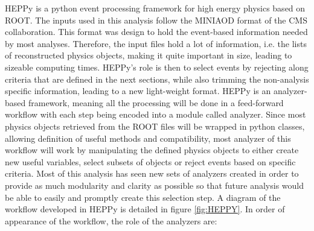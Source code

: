 HEPPy is a python event processing framework for high energy physics based on ROOT. The inputs used in this analysis follow the MINIAOD format of the CMS collaboration. This format was design to hold the event-based information needed by most analyses. Therefore, the input files hold a lot of information, i.e. the lists of reconstructed physics objects, making it quite important in size, leading to sizeable computing times. HEPPy's role is then to select events by rejecting along criteria that are defined in the next sections, while also trimming the non-analysis specific information, leading to a new light-weight format. HEPPy is an analyzer-based framework, meaning all the processing will be done in a feed-forward workflow with each step being encoded into a module called analyzer. Since most physics objects retrieved from the ROOT files will be wrapped in python classes, allowing definition of useful methods and compatibility, most analyzer of this workflow will work by manipulating the defined physics objects to either create new useful variables, select subsets of objects or reject events based on specific criteria. Most of this analysis has seen new sets of analyzers created in order to provide as much modularity and clarity as possible so that future analysis would be able to easily and promptly create this selection step. A diagram of the workflow developed in HEPPy is detailed in figure \ref{fig:HEPPY}. In order of appearance of the workflow, the role of the analyzers are: 
